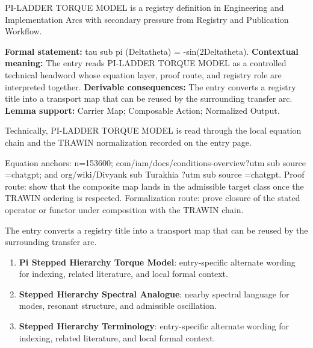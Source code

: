 
\begingroup\small
{}
PI-LADDER TORQUE MODEL is a registry definition in Engineering and Implementation Arcs with secondary pressure from Registry and Publication Workflow.

\begingroup\footnotesize\setlength{\emergencystretch}{3em}\sloppy
\textbf{Formal statement:} tau sub pi (Deltatheta) = -sin(2Deltatheta). \textbf{Contextual meaning:} The entry reads PI-LADDER TORQUE MODEL as a controlled technical headword whose equation layer, proof route, and registry role are interpreted together. \textbf{Derivable consequences:} The entry converts a registry title into a transport map that can be reused by the surrounding transfer arc. \textbf{Lemma support:} Carrier Map; Composable Action; Normalized Output.\par
\endgroup

Technically, PI-LADDER TORQUE MODEL is read through the local equation chain and the TRAWIN normalization recorded on the entry page.

Equation anchors: n=153600; com/iam/docs/conditions-overview?utm sub source =chatgpt; and org/wiki/Divyank sub Turakhia ?utm sub source =chatgpt. Proof route: show that the composite map lands in the admissible target class once the TRAWIN ordering is respected. Formalization route: prove closure of the stated operator or functor under composition with the TRAWIN chain.

The entry converts a registry title into a transport map that can be reused by the surrounding transfer arc.
\endgroup

\begin{enumerate}[leftmargin=1.6em,itemsep=6pt,topsep=4pt]
\item \textbf{Pi Stepped Hierarchy Torque Model}: entry-specific alternate wording for indexing, related literature, and local formal context.
\item \textbf{Stepped Hierarchy Spectral Analogue}: nearby spectral language for modes, resonant structure, and admissible oscillation.
\item \textbf{Stepped Hierarchy Terminology}: entry-specific alternate wording for indexing, related literature, and local formal context.
\end{enumerate}

